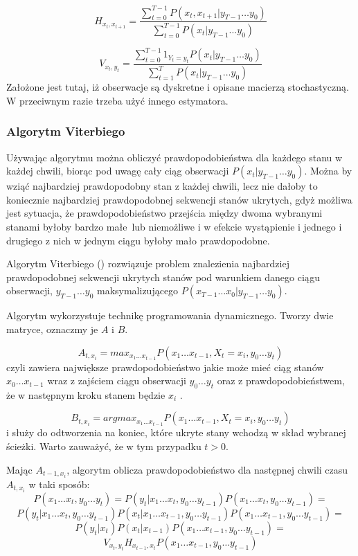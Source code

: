 $$H_{x_t, x_{t+1}} = \frac{\sum_{t=0}^{T-1} P(x_t, x_{t+1} | y_{T-1} \dots y_0)}{\sum_{t=0}^{T-1} P(x_t | y_{T-1} \dots y_0)}$$

$$V_{x_t, y_t} = \frac{\sum_{t=0}^{T-1} 1_{Y_t = y_t} P(x_t | y_{T-1} \dots y_0)}{\sum_{t=1}^T P(x_t | y_{T-1} \dots y_0)}$$
Założone jest tutaj, iż obserwacje są  dyskretne i opisane macierzą stochastyczną. W przeciwnym razie trzeba użyć innego estymatora.
\subsubsection{Algorytm Viterbiego}

Używając algorytmu  można obliczyć prawdopodobieństwa dla każdego stanu w każdej chwili, biorąc
pod uwagę cały ciąg obserwacji $P(x_t | y_{T-1} \dots y_0)$. Można by wziąć najbardziej prawdopodobny stan z każdej chwili,
lecz nie dałoby to koniecznie najbardziej prawdopodobnej sekwencji stanów ukrytych, gdyż możliwa jest sytuacja, że
prawdopodobieństwo przejścia między dwoma wybranymi stanami byłoby bardzo małe lub niemożliwe i w efekcie wystąpienie
i jednego i drugiego z nich w jednym ciągu byłoby mało prawdopodobne.

Algorytm Viterbiego () rozwiązuje problem znalezienia najbardziej prawdopodobnej sekwencji ukrytych stanów pod warunkiem danego ciągu obserwacji, $y_{T-1} \dots y_0$ maksymalizującego $P(x_{T-1} \dots x_0 | y_{T-1} \dots y_0)$.

Algorytm wykorzystuje technikę programowania dynamicznego. Tworzy dwie matryce, oznaczmy je $A$ i $B$.

$$A_{t,x_i} = max_{x_1 \dots x_{t-1}} P(x_1 \dots x_{t-1}, X_t = x_i, y_0 \dots y_t)$$
czyli zawiera największe prawdopodobieństwo jakie może mieć ciąg stanów $x_0 \dots x_{t-1}$ wraz z zajściem ciągu obserwacji $y_0 \dots y_t$ oraz z prawdopodobieństwem, że w następnym kroku stanem będzie $x_i$ .

$$B_{t,x_i} = argmax_{x_1 \dots x_{t-1}} P(x_1 \dots x_{t-1}, X_t = x_i, y_0 \dots y_t)$$ i służy do odtworzenia na koniec, które ukryte stany wchodzą w skład wybranej ścieżki. Warto zauważyć, że w tym przypadku $t > 0$.

Mając $A_{t-1,x_i}$, algorytm oblicza prawdopodobieństwo dla następnej chwili czasu $A_{t,x_i}$ w taki sposób:
$$P(x_1 \dots x_t, y_0 \dots y_t) = P(y_t | x_1 \dots x_t, y_0 \dots y_{t-1}) P(x_1 \dots x_t, y_0 \dots y_{t-1}) =$$
$$P(y_t | x_1 \dots x_t, y_0 \dots y_{t-1}) P(x_t | x_1 \dots x_{t-1}, y_0 \dots y_{t-1}) P(x_1 \dots x_{t-1}, y_0 \dots y_{t-1}) =$$
$$P(y_t | x_t) P(x_t | x_{t-1}) P(x_1 \dots x_{t-1}, y_0 \dots y_{t-1}) =$$
$$V_{x_t, y_t} H_{x_{t-1}, x_t} P(x_1 \dots x_{t-1}, y_0 \dots y_{t-1})$$

